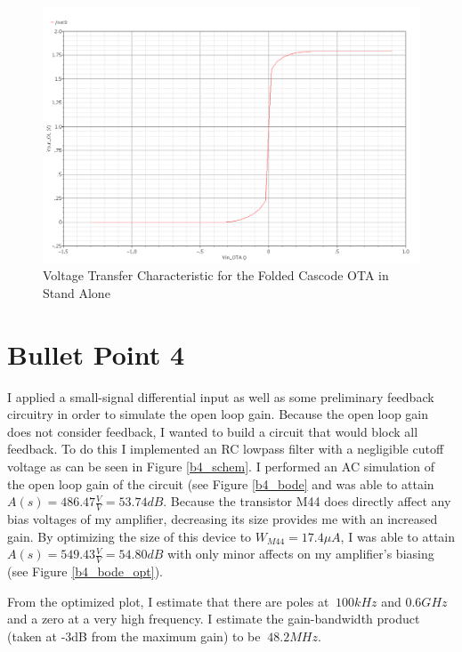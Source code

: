 \documentclass{article}
\begin{document}
\begin{figure}[H]
\centering
\includegraphics[width=6in]{bullet3.png}
\caption{Voltage Transfer Characteristic for the Folded Cascode OTA in Stand Alone}
\label{b3}
\end{figure}
\newpage

\section{Bullet Point 4}
I applied a small-signal differential input as well as some preliminary feedback circuitry in order to simulate the open loop gain. Because the open loop gain does not consider feedback, I wanted to build a  circuit that would block all feedback. To do this I implemented an RC lowpass filter with a negligible cutoff voltage as can be seen in Figure \ref{b4_schem}. I performed an AC simulation of the open loop gain of the circuit (see Figure \ref{b4_bode} and was able to attain $A(s) = 486.47\frac{V}{V} = 53.74dB$. Because the transistor M44 does directly affect any bias voltages of my amplifier, decreasing its size provides me with an increased gain. By optimizing the size of this device to $W_{M44} = 17.4\mu A$, I was able to attain $A(s) = 549.43\frac{V}{V} = 54.80dB$ with only minor affects on my amplifier's biasing (see Figure \ref{b4_bode_opt}).

From the optimized plot, I estimate that there are poles at $~100kHz$ and $0.6GHz$ and a zero at a very high frequency. I estimate the gain-bandwidth product (taken at -3dB from the maximum gain) to be $~48.2MHz$.
\end{document}
